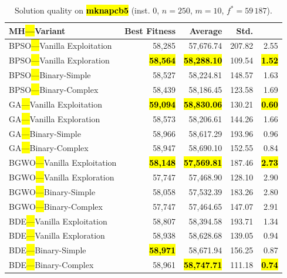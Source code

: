 \documentclass[mathematics,article,accept,moreauthors]{Definitions/mdpi}
\begin{document}
\begin{table}[H]
  \small
  \caption{Solution quality on \textbf{\hl{mknapcb5}} (inst. 0, $n=250$, $m=10$, $f^*=59\,187$).}
  \label{tab:calidad_mknapcb5_0}
  \begin{tabularx}{\textwidth}{lRRRR}
    \toprule
    \textbf{MH\hl{---}Variant} &
    \textbf{Best Fitness} &
    \textbf{Average} &
    \textbf{Std.} &
    \textbf{} \\
    \midrule
    BPSO\hl{---}Vanilla Exploitation &          58,285 &         57,676.74 & 207.82 &         2.55 \\
    BPSO\hl{---}Vanilla Exploration  & \textbf{\hl{58,564}} & \textbf{\hl{58,288.10}} & 109.54 & \textbf{\hl{1.52}} \\
    BPSO\hl{---}Binary-Simple        &          58,527 &         58,224.81 & 148.57 &         1.63 \\
    BPSO\hl{---}Binary-Complex       &          58,439 &         58,186.45 & 123.58 &         1.69 \\
    \midrule
    GA\hl{---}Vanilla Exploitation   & \textbf{\hl{59,094}} & \textbf{\hl{58,830.06}} & 130.21 & \textbf{\hl{0.60}} \\
    GA\hl{---}Vanilla Exploration    &          58,573 &         58,206.61 & 144.26 &         1.66 \\
    GA\hl{---}Binary-Simple          &          58,966 &         58,617.29 & 193.96 &         0.96 \\
    GA\hl{---}Binary-Complex         &          58,947 &         58,690.10 & 152.55 &         0.84 \\
    \midrule
    BGWO\hl{---}Vanilla Exploitation & \textbf{\hl{58,148}} & \textbf{\hl{57,569.81}} & 187.46 & \textbf{\hl{2.73}} \\
    BGWO\hl{---}Vanilla Exploration  &          57,747 &         57,468.90 & 128.10 &         2.90 \\
    BGWO\hl{---}Binary-Simple        &          58,058 &         57,532.39 & 183.26 &         2.80 \\
    BGWO\hl{---}Binary-Complex       &          57,747 &         57,464.65 & 147.07 &         2.91 \\
    \midrule
    BDE\hl{---}Vanilla Exploitation  &          58,807 &         58,394.58 & 193.71 &         1.34 \\
    BDE\hl{---}Vanilla Exploration   &          58,938 &         58,628.68 & 139.05 &         0.94 \\
    BDE\hl{---}Binary-Simple         & \textbf{\hl{58,971}} &         58,671.94 & 156.25 &         0.87 \\
    BDE\hl{---}Binary-Complex        &          58,961 & \textbf{\hl{58,747.71}} & 111.18 & \textbf{\hl{0.74}} \\
    \bottomrule
  \end{tabularx}
\end{table}
\end{document}

